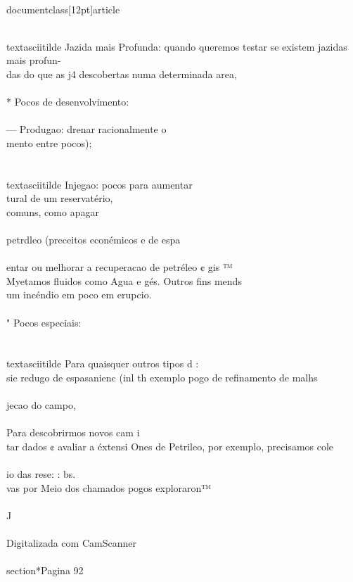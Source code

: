 \\documentclass[12pt]{article}
\begin{document}
{\\textasciitilde{} Jazida mais Profunda: quando queremos testar se existem jazidas mais profun-\\
das do que as j4 descobertas numa determinada area,\\
\\
* Pocos de desenvolvimento:\\
\\
— Produgao: drenar racionalmente o\\
mento entre pocos);\\
\\
\\textasciitilde{} Injegao: pocos para aumentar\\
tural de um reservatério,\\
comuns, como apagar\\
\\
petrdleo (preceitos econémicos e de espa\\
\\
entar ou melhorar a recuperacao de petréleo ¢ gis ™\\
Myetamos fluidos como Agua e gés. Outros fins mends\\
um incéndio em poco em erupcio.\\
\\
" Pocos especiais:\\
\\
\\textasciitilde{} Para quaisquer outros tipos d :\\
sie redugo de espasanienc (inl th exemplo pogo de refinamento de malhs\\
\\
jecao do campo,\\
\\
Para descobrirmos novos cam i\\
tar dados ¢ avaliar a éxtensi Ones de Petrileo, por exemplo, precisamos cole\\
\\
io das rese: : bs.\\
vas por Meio dos chamados pogos exploraron™\\
\\
J\\
\\
Digitalizada com CamScanner\\

\\section*{Pagina 92}

}
\end{document}
